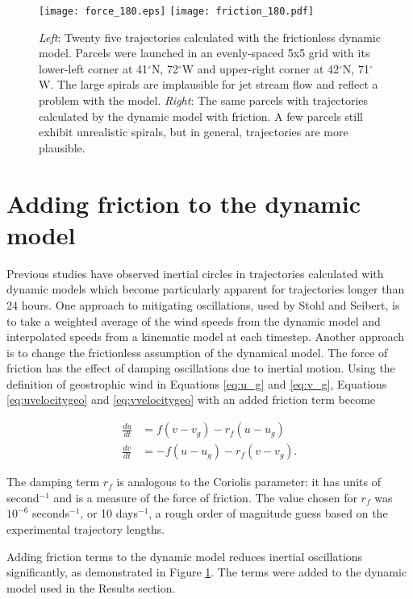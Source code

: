 \begin{figure}
    \centering
        \texttt{[image: force\_180.eps]}
        \texttt{[image: friction\_180.pdf]}
    \caption{\textit{Left}: Twenty five trajectories calculated with the frictionless dynamic model. 
    Parcels were launched in an evenly-spaced 5x5 grid with its lower-left corner at 41$^\circ$N, 72$^\circ$W and upper-right corner at 42$^\circ$N, 71$^\circ$W. 
    The large spirals are implausible for jet stream flow and reflect a problem with the model. 
    \textit{Right}: The same parcels with trajectories calculated by the dynamic model with friction.
    A few parcels still exhibit unrealistic spirals, but in general, trajectories are more plausible.}
    \label{fig:force_180}
\end{figure}

\section{Adding friction to the dynamic model}

Previous studies have observed inertial circles in trajectories calculated with dynamic models which become particularly apparent for trajectories longer than 24 hours. \cite{stohl_accuracy_1998}
One approach to mitigating oscillations, used by Stohl and Seibert, is to take a weighted average of the wind speeds from the dynamic model and interpolated speeds from a kinematic model at each timestep.
Another approach is to change the frictionless assumption of the dynamical model.
The force of friction has the effect of damping oscillations due to inertial motion.
Using the definition of geostrophic wind in Equations \ref{eq:u_g} and \ref{eq:v_g}, Equations \ref{eq:uvelocitygeo} and \ref{eq:vvelocitygeo} with an added friction term become

\begin{align}
    \frac{du}{dt} &= f (v - v_g) - r_f (u - u_g) \\
    \frac{dv}{dt} &= -f (u - u_g) - r_f (v - v_g).   
\end{align}

The damping term $r_f$ is analogous to the Coriolis parameter: it has units of second$^{-1}$ and is a measure of the force of friction.
The value chosen for $r_f$ was $10^{-6}$ seconds$^{-1}$, or 10 days$^{-1}$, a rough order of magnitude guess based on the experimental trajectory lengths.

Adding friction terms to the dynamic model reduces inertial oscillations significantly, as demonstrated in Figure \ref{fig:force_180}.
The terms were added to the dynamic model used in the Results section. 

